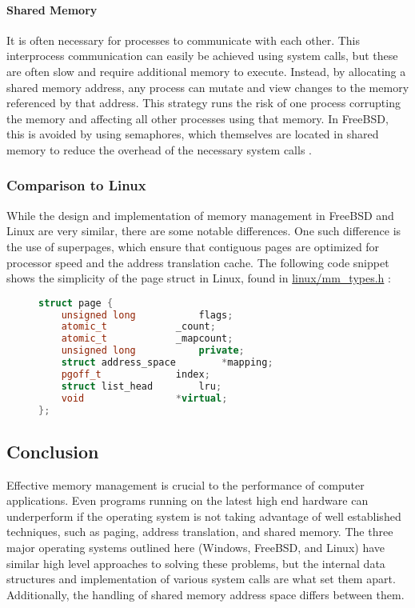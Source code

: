\documentclass[letterpaper,draftclsnofoot,10pt,onecolumn,titlepage]{IEEEtran}\usepackage[margin=0.75in]{geometry}
\begin{document}
            \paragraph{Shared Memory}
            It is often necessary for processes to communicate with each other. This interprocess communication can 
            easily be achieved using system calls, but these are often slow and require additional memory to execute.
            Instead, by allocating a shared memory address, any process can mutate and view changes to the memory 
            referenced by that address. This strategy runs the risk of one process corrupting the memory and affecting
            all other processes using that memory. In FreeBSD, this is avoided by using semaphores, which themselves 
            are located in shared memory to reduce the overhead of the necessary system calls \cite{freebsd}.

        \subsubsection{Comparison to Linux}
        While the design and implementation of memory management in FreeBSD and Linux are very similar, there are 
        some notable differences. One such difference is the use of superpages, which ensure that contiguous pages 
        are optimized for processor speed and the address translation cache. The following code snippet shows the 
        simplicity of the page struct in Linux, found in \url{linux/mm_types.h} \cite{linux}:

\begin{figure}[H]
\begin{lstlisting}[language=C++]
struct page {
	unsigned long 			flags;
	atomic_t			_count;
	atomic_t			_mapcount;
	unsigned long			private;
	struct address_space		*mapping;
	pgoff_t				index;
	struct list_head		lru;
	void				*virtual;
};
\end{lstlisting}
\end{figure}

    \subsection{Conclusion}
    Effective memory management is crucial to the performance of computer applications. Even programs 
    running on the latest high end hardware can underperform if the operating system is not taking 
    advantage of well established techniques, such as paging, address translation, and shared memory.
    The three major operating systems outlined here (Windows, FreeBSD, and Linux) have similar high level
    approaches to solving these problems, but the internal data structures and implementation of various
    system calls are what set them apart. Additionally, the handling of shared memory address space differs
    between them.
\end{document}
